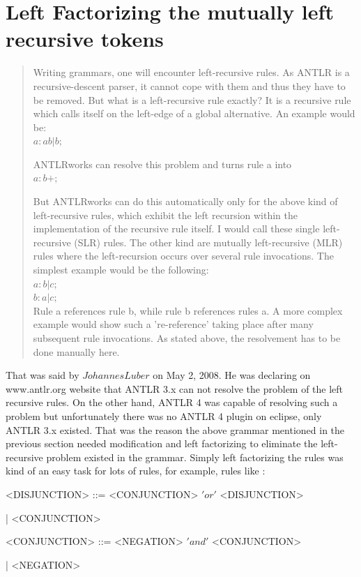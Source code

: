 \documentclass[a4paper]{article}
\begin{document}
\section{Left Factorizing the mutually left recursive tokens}

 \begin{quotation}
 Writing grammars, one will encounter left-recursive rules. As ANTLR is a recursive-descent parser, it cannot cope with them and thus they have to be removed. But what is a left-recursive rule exactly? It is a recursive rule which calls itself on the left-edge of a global alternative. An example would be:
$$ $$ 
$a   :    a b
    |    b
    ;$
    
    $$ $$
ANTLRworks can resolve this problem and turns rule a into
$$ $$
$a   :    b+;$

$$ $$
But ANTLRworks can do this automatically only for the above kind of left-recursive rules, which exhibit the left recursion within the implementation of the recursive rule itself. I would call these single left-recursive (SLR) rules. The other kind are mutually left-recursive (MLR) rules where the left-recursion occurs over several rule invocations. The simplest example would be the following:
$$ $$
$a   :    b
    |    c
    ;$
 $$ $$ 
 $$ $$
$b   :    a
    |    c
    ;$
    $$ $$
Rule a references rule b, while rule b references rules a. A more complex example would show such a 're-reference' taking place after many subsequent rule invocations. As stated above, the resolvement has to be done manually here.
 \end{quotation}
 
 That was said by $ Johannes Luber$ on May 2, 2008. He was declaring on www.antlr.org website that ANTLR 3.x can not resolve the problem of the left recursive rules. On the other hand, ANTLR 4 was capable of resolving such a problem but unfortunately there was no ANTLR 4 plugin on eclipse, only ANTLR 3.x existed. That was the reason the above grammar mentioned in the previous section needed modification and left factorizing to eliminate the left-recursive problem existed in the grammar.
 \newpage
 Simply left factorizing the rules was kind of an easy task for lots of rules, for example,  rules like :
 
 $$ $$
 $$ $$
 <DISJUNCTION> ::= <CONJUNCTION> $'or'$ <DISJUNCTION> \newline \centerline {|  <CONJUNCTION>}
 
 $$ $$ 
 <CONJUNCTION> ::= <NEGATION> $'and'$ <CONJUNCTION> \newline \centerline { | 
 <NEGATION>}
 
\end{document}
